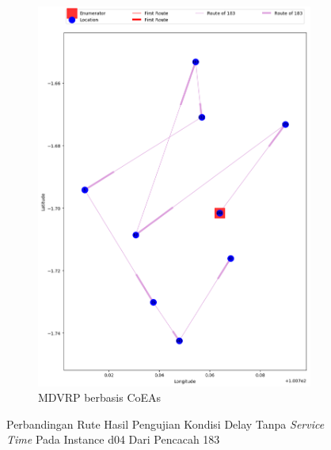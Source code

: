 \begin{figure}[H]
	\centering
	\begin{subfigure}[t]{\textwidth}
		\centering
		\includegraphics[width=\textwidth]{Resources/Images/delayed_5/real_m15_n100_delayed_5_183_coes}
		\caption{MDVRP berbasis CoEAs}
		\label{fig:real_m15_n100_delayed_5_183_coes}
	\end{subfigure}
	\caption{Perbandingan Rute Hasil Pengujian Kondisi Delay Tanpa \textit{Service Time} Pada Instance d04 Dari Pencacah 183}
	\label{fig:real_m15_n100_delayed_5_183}
\end{figure}



